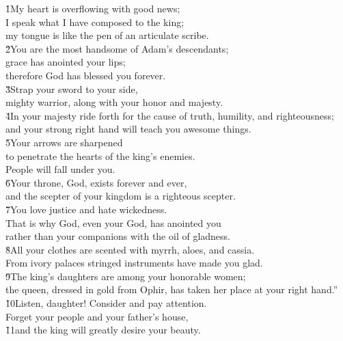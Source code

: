 \begin{poetry}
\poeml \v{1}My heart is overflowing with good news; \\
\poemll    I speak what I have composed to the king; \\
\poemlll       my tongue is like the pen of an articulate scribe. \\
\poeml \v{2}You are the most handsome of Adam's descendants; \\
\poemll    grace has anointed your lips; \\
\poemlll       therefore God has blessed you forever. \\
\poeml \v{3}Strap your sword to your side, \\
\poemll    mighty warrior, along with your honor and majesty. \\
\poeml \v{4}In your majesty ride forth for the cause of truth, humility, and righteousness; \\
\poemll    and your strong right hand will teach you awesome things. \\
\poeml \v{5}Your arrows are sharpened \\
\poemll    to penetrate the hearts of the king's enemies. \\
\poemlll       People will fall under you. \\
\poeml \v{6}Your throne, God, exists forever and ever, \\
\poemll    and the scepter of your kingdom is a righteous scepter. \\
\poeml \v{7}You love justice and hate wickedness. \\
\poemll    That is why God, even your God, has anointed you \\
\poemlll       rather than your companions with the oil of gladness. \\
\poeml \v{8}All your clothes are scented with myrrh, aloes, and cassia. \\
\poemll    From ivory palaces stringed instruments have made you glad. \\
\poeml \v{9}The king's daughters are among your honorable women; \\
\poemll    the queen, dressed in gold from Ophir, has taken her place at your right hand.'' \\
\poeml \v{10}Listen, daughter! Consider and pay attention. \\
\poemll    Forget your people and your father's house, \\
\poeml \v{11}and the king will greatly desire your beauty. \\

\end{poetry}
